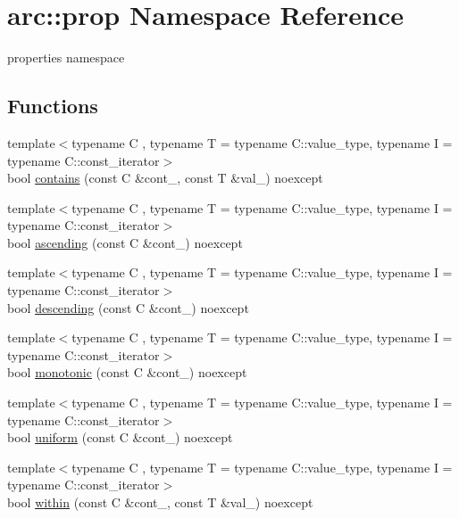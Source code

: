 \hypertarget{namespacearc_1_1prop}{}\section{arc\+:\+:prop Namespace Reference}
\label{namespacearc_1_1prop}


properties namespace  


\subsection*{Functions}
\begin{DoxyCompactItemize}
\item 
{\footnotesize template$<$typename C , typename T  = typename C\+::value\+\_\+type, typename I  = typename C\+::const\+\_\+iterator$>$ }\\bool \mbox{\hyperlink{namespacearc_1_1prop_a54974d0d56ee90909eac6cdd1b94cff5}{contains}} (const C \&cont\+\_\+, const T \&val\+\_\+) noexcept
\item 
{\footnotesize template$<$typename C , typename T  = typename C\+::value\+\_\+type, typename I  = typename C\+::const\+\_\+iterator$>$ }\\bool \mbox{\hyperlink{namespacearc_1_1prop_a026d439c76bdafd78b68875044d7b087}{ascending}} (const C \&cont\+\_\+) noexcept
\item 
{\footnotesize template$<$typename C , typename T  = typename C\+::value\+\_\+type, typename I  = typename C\+::const\+\_\+iterator$>$ }\\bool \mbox{\hyperlink{namespacearc_1_1prop_a156186f9684c79f4f28bb793af35f0bd}{descending}} (const C \&cont\+\_\+) noexcept
\item 
{\footnotesize template$<$typename C , typename T  = typename C\+::value\+\_\+type, typename I  = typename C\+::const\+\_\+iterator$>$ }\\bool \mbox{\hyperlink{namespacearc_1_1prop_a0b6cfeae4fa16eddbb6b7f1e9c355258}{monotonic}} (const C \&cont\+\_\+) noexcept
\item 
{\footnotesize template$<$typename C , typename T  = typename C\+::value\+\_\+type, typename I  = typename C\+::const\+\_\+iterator$>$ }\\bool \mbox{\hyperlink{namespacearc_1_1prop_aa5ffd8e519bbfe13d8b6c9b9ebf81855}{uniform}} (const C \&cont\+\_\+) noexcept
\item 
{\footnotesize template$<$typename C , typename T  = typename C\+::value\+\_\+type, typename I  = typename C\+::const\+\_\+iterator$>$ }\\bool \mbox{\hyperlink{namespacearc_1_1prop_a160eaff41b7223c20c03ca76ee4e1fb9}{within}} (const C \&cont\+\_\+, const T \&val\+\_\+) noexcept

\end{DoxyCompactItemize}
